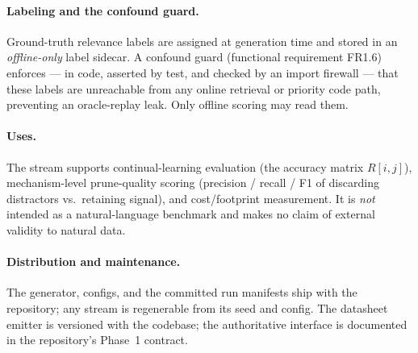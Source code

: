 \paragraph{Labeling and the confound guard.} Ground-truth relevance labels are
assigned at generation time and stored in an \emph{offline-only} label sidecar.
A confound guard (functional requirement FR1.6) enforces --- in code, asserted
by test, and checked by an import firewall --- that these labels are unreachable
from any online retrieval or priority code path, preventing an oracle-replay
leak. Only offline scoring may read them.

\paragraph{Uses.} The stream supports continual-learning evaluation (the
accuracy matrix $R[i,j]$), mechanism-level prune-quality scoring (precision /
recall / F1 of discarding distractors vs.\ retaining signal), and cost/footprint
measurement. It is \emph{not} intended as a natural-language benchmark and makes
no claim of external validity to natural data.

\paragraph{Distribution and maintenance.} The generator, configs, and the
committed run manifests ship with the repository; any stream is regenerable from
its seed and config. The datasheet emitter is versioned with the codebase; the
authoritative interface is documented in the repository's Phase~1 contract.
